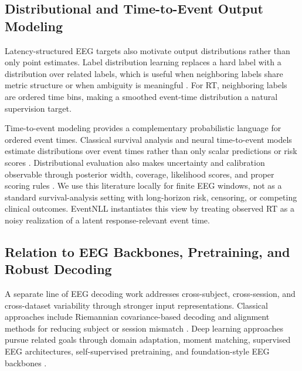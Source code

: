 \documentclass[12pt]{article}
\begin{document}
\subsection{Distributional and Time-to-Event Output Modeling}
Latency-structured EEG targets also motivate output distributions rather than only point estimates. Label distribution learning replaces a hard label with a distribution over related labels, which is useful when neighboring labels share metric structure or when ambiguity is meaningful \citep{Geng2016LabelDistributionLearning}. For RT, neighboring labels are ordered time bins, making a smoothed event-time distribution a natural supervision target.

Time-to-event modeling provides a complementary probabilistic language for ordered event times. Classical survival analysis and neural time-to-event models estimate distributions over event times rather than only scalar predictions or risk scores \citep{Cox1972CoxPH,Lee2018DeepHit}. Distributional evaluation also makes uncertainty and calibration observable through posterior width, coverage, likelihood scores, and proper scoring rules \citep{Chapfuwa2023Calibration,Haider2020SurvivalDistributions}. We use this literature locally for finite EEG windows, not as a standard survival-analysis setting with long-horizon risk, censoring, or competing clinical outcomes. EventNLL instantiates this view by treating observed RT as a noisy realization of a latent response-relevant event time.

\subsection{Relation to EEG Backbones, Pretraining, and Robust Decoding}
A separate line of EEG decoding work addresses cross-subject, cross-session, and cross-dataset variability through stronger input representations. Classical approaches include Riemannian covariance-based decoding and alignment methods for reducing subject or session mismatch \citep{Barachant2012RiemannianBCI,Jayaram2016TransferLearningBCI,Zanini2018RiemannianTL,HeWu2020EuclideanAlignment}. Deep learning approaches pursue related goals through domain adaptation, moment matching, supervised EEG architectures, self-supervised pretraining, and foundation-style EEG backbones \citep{Ganin2016DANN,SunSaenko2016DeepCORAL,Kostas2021BENDR,wang2024eegpt,Jiang2024LaBraM,Chen2024EEGFormer,Wang2025EEGMamba,ElOuahidi2025REVE,Yue2024BrainGPT}.
\end{document}

